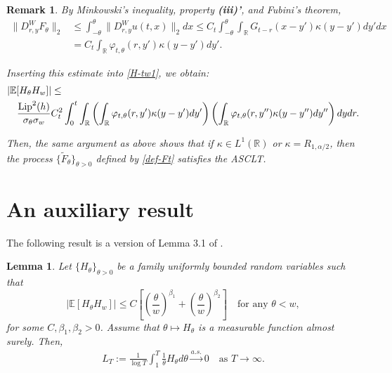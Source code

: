 \documentclass[12pt]{article}
\newtheorem{lemma}[theorem]{Lemma}
\newtheorem{remark}[theorem]{Remark}
\def\bE{\mathbb{E}}
\def\bR{\mathbb{R}}
\def\k{\kappa}
\newcommand{\lipf}{h}
\begin{document}
\begin{remark}
{By Minkowski's inequality, property {\bf (iii)'}, and Fubini's theorem,
\begin{align*}
\|D_{r,y}^W F_{\theta}\|_2 & \leq \int_{-\theta}^{\theta}\|D_{r,y}^W u(t,x)\|_2 dx \leq C_t 
\int_{-\theta}^{\theta} \int_{\bR} G_{t-r}(x-y')\k(y-y')dy' dx\\
&= C_t  \int_{\bR}\varphi_{t,\theta}(r,y')\k(y-y')dy'.
\end{align*}

Inserting this estimate into \eqref{H-tw1}, we obtain:
\begin{align*}
& |\bE[H_{\theta}H_w]| \leq \\
& \quad \frac{{\rm Lip}^2(\lipf)}{\sigma_{\theta} \sigma_{w}} C_t^2  \int_0^t \int_{\bR} \left( \int_{\bR}\varphi_{t,\theta}(r,y')\k(y-y')dy' \right) 
\left( \int_{\bR}\varphi_{t,\theta}(r,y'')\k(y-y'')dy'' \right) dydr.
\end{align*}

Then, the same argument as above shows that if $\kappa \in L^1(\bR)$ or $\kappa=R_{1,\alpha/2}$, then the process $\{\widetilde{F}_{\theta}\}_{\theta>0}$ defined by \eqref{def-Ft} satisfies the ASCLT.
}
\end{remark}

\appendix

\section{An auxiliary result}

The following result is a version of Lemma 3.1 of \cite{BXZ}.

\begin{lemma}
\label{lemA}
Let $\{ H_\theta\}_{\theta > 0}$ be a family uniformly bounded random variables such that 
\[
\big| \bE[ H_{\theta} H_{w} ] \big| \leq C \left[ \left( \frac{\theta}{w} \right)^{\beta_1}+ \left( \frac{\theta}{w} \right)^{\beta_2}\right] \quad \mbox{for any $\theta<w$}, 
\]
for some $C,\beta_1,\beta_2>0$. Assume that $\theta\mapsto H_\theta$ is a measurable
function almost surely. Then,
\begin{align*} 
L_T:=\frac{1}{\log T} \int_1^T \frac{1}{\theta} H_\theta d\theta \stackrel{a.s.}{\longrightarrow} 0 \quad \mbox{as $T \to \infty$}.
\end{align*}
\end{lemma}
\end{document}

